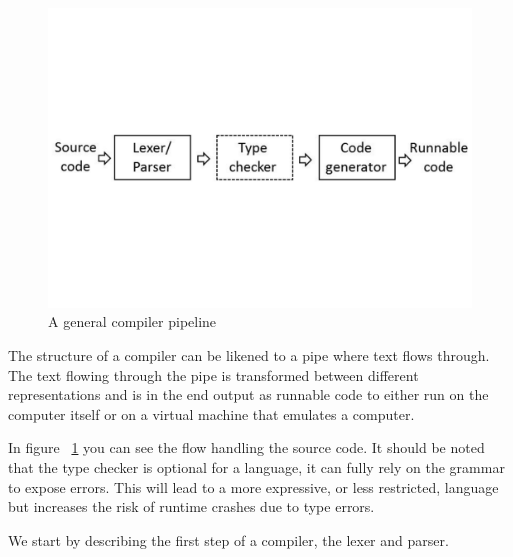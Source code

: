 

\begin{figure}[h!]
  \centering
  \includegraphics[width=0.6\pdfpagewidth]{figure/generalpipeline2}
  \caption{A general compiler pipeline}
  \label{fig:generalpipeline}
\end{figure}


The structure of a compiler can be likened to a pipe where text flows through. 
The text flowing through the pipe is transformed between different representations and is in
the end output as runnable code to either run on the computer itself or on a virtual machine
that emulates a computer. 

In figure ~\ref{fig:generalpipeline} you can see the flow handling the source code.
It should be noted that the type checker is optional for a language, it can
fully rely on the grammar to expose errors. This will lead to a more expressive, 
or less restricted, language but increases the risk of runtime crashes due to type errors.

We start by describing the first step of a compiler, the lexer and parser.









